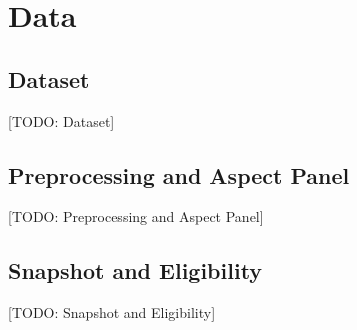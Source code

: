 \chapter{Data}
\section{Dataset}
[TODO: Dataset]

\section{Preprocessing and Aspect Panel}
[TODO: Preprocessing and Aspect Panel]

\section{Snapshot and Eligibility}
[TODO: Snapshot and Eligibility]
